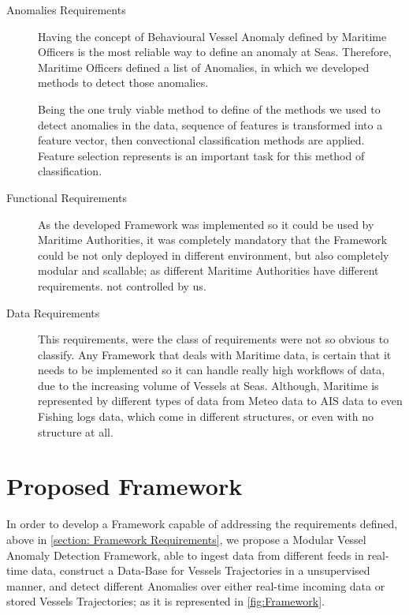 \begin{description}
\item[Anomalies Requirements] Having the concept of Behavioural Vessel Anomaly defined by Maritime Officers is the most reliable way to define an anomaly at Seas. Therefore, Maritime Officers defined a list of Anomalies, in which we developed methods to detect those anomalies. 

Being the one truly viable method to define of the methods we used to detect anomalies in the data, 
sequence of features is transformed into a feature vector, then convectional classification methods are applied. Feature selection represents is an important task for this method of classification.

\item [Functional Requirements] As the developed Framework was implemented so it could be used by Maritime Authorities, it was completely mandatory that the Framework could be not only deployed in different environment, but also completely modular and scallable; as different Maritime Authorities have different requirements. 
not controlled by us.

\item [Data Requirements] This requirements, were the class of requirements were not so obvious to classify. Any Framework that deals with Maritime data, is certain that it needs to be implemented so it can handle really high workflows of data, due to the increasing volume of Vessels at Seas. Although, Maritime is represented by different types of data from Meteo data to AIS data to even Fishing logs data, which come in different structures, or even with no structure at all.
\end{description}



\section{Proposed Framework}
In order to develop a Framework capable of addressing the requirements defined, above in \ref{section: Framework Requirements}, we propose a Modular Vessel Anomaly Detection Framework, able to ingest data from different feeds in real-time data, construct a Data-Base for Vessels Trajectories in a unsupervised manner, and detect different Anomalies over either real-time incoming data or stored Vessels Trajectories; as it is represented in \ref{fig:Framework}.

